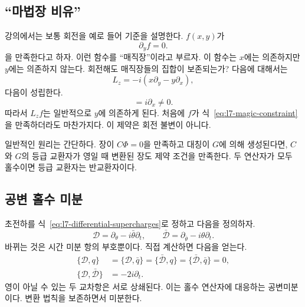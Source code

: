 \subsection{``마법장 비유''}

강의에서는 보통 회전을 예로 들어 기준을 설명한다. \(f(x,y)\)가
\begin{equation}
\partial_y f=0.
\label{eq:l7-magic-constraint}
\end{equation}
을 만족한다고 하자. 이런 함수를 ``매직장''이라고 부르자. 이 함수는 \(x\)에는 의존하지만 \(y\)에는 의존하지 않는다. 회전해도 매직장들의 집합이 보존되는가? 다음에 대해서는
\begin{equation}
L_z=-i\left(x\partial_y-y\partial_x\right),
\end{equation}
다음이 성립한다.
\begin{equation}
[\partial_y,L_z]=i\partial_x\neq0.
\end{equation}
따라서 \(L_z f\)는 일반적으로 \(y\)에 의존하게 된다. 처음에 \(f\)가 식~\eqref{eq:l7-magic-constraint}을 만족하더라도 마찬가지다. 이 제약은 회전 불변이 아니다.

일반적인 원리는 간단하다. 장이 \(C\Phi=0\)을 만족하고 대칭이 \(G\)에 의해 생성된다면, \(C\)와 \(G\)의 등급 교환자가 영일 때 변환된 장도 제약 조건을 만족한다. 두 연산자가 모두 홀수이면 등급 교환자는 반교환자이다.

\begin{classroomqa}
\end{classroomqa}

\subsection{공변 홀수 미분}

초전하를 식~\eqref{eq:l7-differential-supercharges}로 정하고 다음을 정의하자.
\begin{equation}
\mathcal D=\partial_\theta-i\bar\theta\partial_t,
\qquad
\bar{\mathcal D}=\partial_{\bar\theta}-i\theta\partial_t.
\label{eq:l7-covariant-derivatives}
\end{equation}
바뀌는 것은 시간 미분 항의 부호뿐이다. 직접 계산하면 다음을 얻는다.
\begin{align}
\{\mathcal D,q\}
&=\{\mathcal D,\bar q\}
=\{\bar{\mathcal D},q\}
=\{\bar{\mathcal D},\bar q\}=0,\\
\{\mathcal D,\bar{\mathcal D}\}&=-2i\partial_t.
\label{eq:l7-covariant-algebra}
\end{align}
영이 아닐 수 있는 두 교차항은 서로 상쇄된다. 이는 홀수 연산자에 대응하는 공변미분이다. 변환 법칙을 보존하면서 미분한다.


